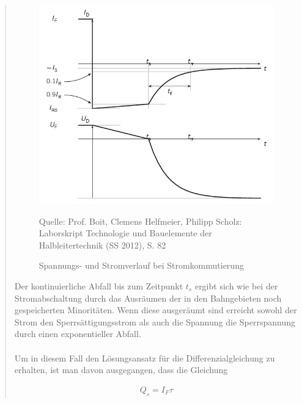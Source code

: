 \begin{quote}
	\begin{figure}[H]
        \centering
        \includegraphics[scale=0.7]{./SchaltverhaltenBilder/Stromkommutierung.jpg}
        \caption{Spannungs- und Stromverlauf bei Stromkommutierung}
             \begin{center}
                 \small Quelle: Prof. Boit, Clemens Helfmeier, Philipp Scholz: Laborskript Technologie und Bauelemente der Halbleitertechnik (SS 2012), S. 82
             \end{center} 
        \label{fig:kommverlauf}
    \end{figure}
	
	\vspace{2em}
	
	Der kontinuierliche Abfall bis zum Zeitpunkt $t_s$ ergibt sich wie bei der
	Stromabschaltung durch das Ausräumen der in den Bahngebieten noch 
	gespeicherten Minoritäten. Wenn diese ausgeräumt sind erreicht sowohl der 
	Strom den Sperrsättigungsstrom als auch die Spannung die Sperrspannung durch  
	einen exponentieller Abfall.\\
	\\
	Um in diesem Fall den Lösungsansatz für die Differenzialgleichung zu 
	erhalten, ist man davon ausgegangen, dass die Gleichung
	
	\begin{equation}
         \begin{split}
             Q_{s}=I_{F}\tau
             \end{split}
         \label{eq:tsundtau2}
    \end{equation}
	

\end{quote}
